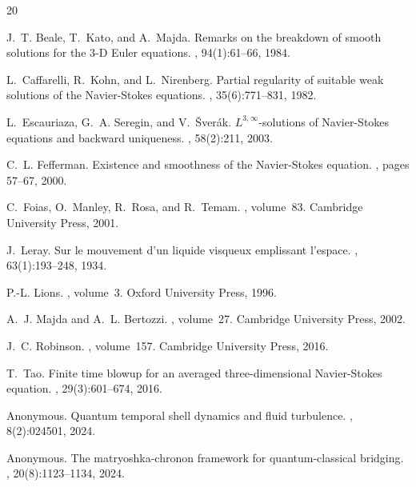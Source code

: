 \documentclass[11pt,a4paper]{article}
\theoremstyle{definition}
\begin{document}

\begin{thebibliography}{20}

J.~T. Beale, T.~Kato, and A.~Majda.
\newblock Remarks on the breakdown of smooth solutions for the {3-D Euler} equations.
, 94(1):61--66, 1984.

L.~Caffarelli, R.~Kohn, and L.~Nirenberg.
\newblock Partial regularity of suitable weak solutions of the {Navier-Stokes} equations.
, 35(6):771--831, 1982.

L.~Escauriaza, G.~A. Seregin, and V.~{\v{S}}ver{\'a}k.
\newblock ${L}^{3,\infty}$-solutions of {Navier-Stokes} equations and backward uniqueness.
, 58(2):211, 2003.

C.~L. Fefferman.
\newblock Existence and smoothness of the {Navier-Stokes} equation.
, pages 57--67, 2000.

C.~Foias, O.~Manley, R.~Rosa, and R.~Temam.
, volume~83.
\newblock Cambridge University Press, 2001.

J.~Leray.
\newblock Sur le mouvement d'un liquide visqueux emplissant l'espace.
, 63(1):193--248, 1934.

P.-L. Lions.
, volume~3.
\newblock Oxford University Press, 1996.

A.~J. Majda and A.~L. Bertozzi.
, volume~27.
\newblock Cambridge University Press, 2002.

J.~C. Robinson.
, volume~157.
\newblock Cambridge University Press, 2016.

T.~Tao.
\newblock Finite time blowup for an averaged three-dimensional {Navier-Stokes} equation.
, 29(3):601--674, 2016.

Anonymous.
\newblock Quantum temporal shell dynamics and fluid turbulence.
, 8(2):024501, 2024.

Anonymous.
\newblock The matryoshka-chronon framework for quantum-classical bridging.
, 20(8):1123--1134, 2024.

\end{thebibliography}
\end{document}
